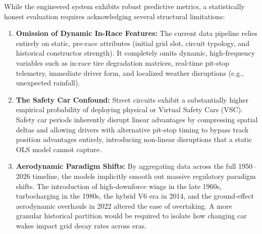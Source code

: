 While the engineered system exhibits robust predictive metrics, a statistically honest evaluation requires acknowledging several structural limitations:
\begin{enumerate}
    \item \textbf{Omission of Dynamic In-Race Features:} The current data pipeline relies entirely on static, pre-race attributes (initial grid slot, circuit typology, and historical constructor strength). It completely omits dynamic, high-frequency variables such as in-race tire degradation matrices, real-time pit-stop telemetry, immediate driver form, and localized weather disruptions (e.g., unexpected rainfall).
    \item \textbf{The Safety Car Confound:} Street circuits exhibit a substantially higher empirical probability of deploying physical or Virtual Safety Cars (VSC). Safety car periods inherently disrupt linear advantages by compressing spatial deltas and allowing drivers with alternative pit-stop timing to bypass track position advantages entirely, introducing non-linear disruptions that a static OLS model cannot capture.
    \item \textbf{Aerodynamic Paradigm Shifts:} By aggregating data across the full 1950--2026 timeline, the models implicitly smooth out massive regulatory paradigm shifts. The introduction of high-downforce wings in the late 1960s, turbocharging in the 1980s, the hybrid V6 era in 2014, and the ground-effect aerodynamic overhauls in 2022 altered the ease of overtaking. A more granular historical partition would be required to isolate how changing car wakes impact grid decay rates across eras.
\end{enumerate}